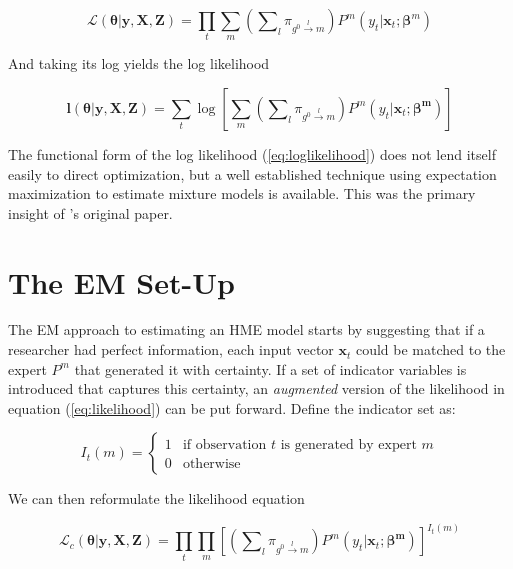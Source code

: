 \documentclass[12pt]{article}
\newcommand{\sumgateprod}[3]{\pi_{#1 \overset{#3}{\longrightarrow} #2}}
\newcommand{\shortsum}[1]{\sum \nolimits_{#1}}
\begin{document}
\begin{equation} \label{eq:likelihood}
  \mathcal{L}(\boldsymbol{\theta}| \boldsymbol{y}, \boldsymbol{X}, \boldsymbol{Z}) = \prod_{t}  \sum_{m} \left( \shortsum{l} \sumgateprod{g^{0}}{m}{l} \right)  P^{m}(y_{t}| \boldsymbol{x}_{t}; \boldsymbol{\beta}^{m})
\end{equation}

And taking its log yields the log likelihood

\begin{equation} \label{eq:loglikelihood}
  \boldsymbol{l}(\boldsymbol{\theta}| \boldsymbol{y}, \boldsymbol{X}, \boldsymbol{Z}) = \sum_{t} \log \left[ \sum_{m} \left( \shortsum{l} \sumgateprod{g^{0}}{m}{l} \right) P^{m}(y_{t}| \boldsymbol{x}_{t}; \boldsymbol{\beta^{m}}) \right]
\end{equation}

The functional form of the log likelihood (\ref{eq:loglikelihood}) does not
lend itself easily to direct optimization, but a well established
technique using expectation maximization \citep{EM_DLR1977} to estimate mixture
models is available. This was the primary insight of \citet{JordanJacobs1993}'s
original paper.


\section{The EM Set-Up} \label{sec:Estimation}

The EM approach to estimating an HME model starts by suggesting that if a
researcher had perfect information, each input vector $\boldsymbol{x}_{t}$ could be matched
to the expert $P^{m}$ that generated it with certainty. If a set of indicator
variables is introduced that captures this certainty, an \textit{augmented}
version of the likelihood in equation (\ref{eq:likelihood}) can be put forward.
Define the indicator set as:

\begin{equation} \label{eq:indicator}
  I_{t}(m) = \begin{cases} 
     1 & \textrm{if observation $t$ is generated by expert $m$} \\
     0 & \textrm{otherwise}
             \end{cases}
\end{equation}

We can then reformulate the likelihood equation

\begin{equation}  \label{eq:auglikelihood}
  \mathcal{L}_{c}(\boldsymbol{\theta}| \boldsymbol{y}, \boldsymbol{X}, \boldsymbol{Z}) = \prod_{t} \prod_{m} \left[ \left( \shortsum{l} \sumgateprod{g^{0}}{m}{l} \right)  P^{m}(y_{t}| \boldsymbol{x}_{t}; \boldsymbol{\beta^{m}}) \right]^{I_{t}(m)}
\end{equation}
\end{document}
